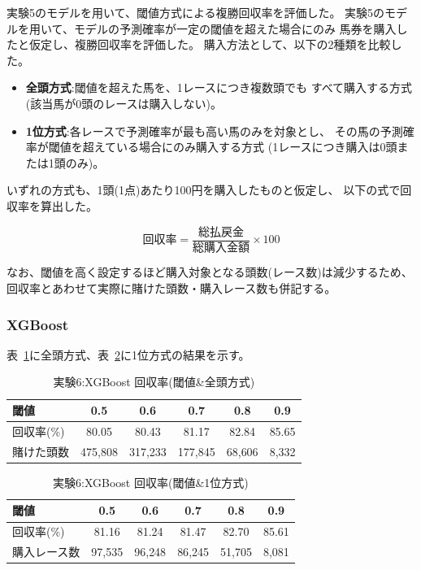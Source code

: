 \documentclass[dvipdfmx, a4paper, 11pt, titlepage]{jsarticle}
\begin{document}
実験5のモデルを用いて、閾値方式による複勝回収率を評価した。
実験5のモデルを用いて、モデルの予測確率が一定の閾値を超えた場合にのみ
馬券を購入したと仮定し、複勝回収率を評価した。
購入方法として、以下の2種類を比較した。

\begin{itemize}
  \item \textbf{全頭方式}:閾値を超えた馬を、1レースにつき複数頭でも
        すべて購入する方式(該当馬が0頭のレースは購入しない)。
  \item \textbf{1位方式}:各レースで予測確率が最も高い馬のみを対象とし、
        その馬の予測確率が閾値を超えている場合にのみ購入する方式
        (1レースにつき購入は0頭または1頭のみ)。
\end{itemize}

いずれの方式も、1頭(1点)あたり100円を購入したものと仮定し、
以下の式で回収率を算出した。

\[
  \text{回収率} = \frac{\text{総払戻金}}{\text{総購入金額}} \times 100
\]

なお、閾値を高く設定するほど購入対象となる頭数(レース数)は減少するため、
回収率とあわせて実際に賭けた頭数・購入レース数も併記する。


\subsubsection*{XGBoost}

表~\ref{tab:exp6_xgb_all}に全頭方式、表~\ref{tab:exp6_xgb_top1}に1位方式の結果を示す。

\begin{table}[H]
  \centering
  \caption{実験6:XGBoost 回収率(閾値\&全頭方式)}
  \label{tab:exp6_xgb_all}
  \begin{tabular}{lccccc}
    \toprule
    閾値 & 0.5 & 0.6 & 0.7 & 0.8 & 0.9 \\
    \midrule
    回収率(\%)   & 80.05 & 80.43 & 81.17 & 82.84 & 85.65 \\
    賭けた頭数   & 475{,}808 & 317{,}233 & 177{,}845 & 68{,}606 & 8{,}332 \\
    \bottomrule
  \end{tabular}
\end{table}

\begin{table}[H]
  \centering
  \caption{実験6:XGBoost 回収率(閾値\&1位方式)}
  \label{tab:exp6_xgb_top1}
  \begin{tabular}{lccccc}
    \toprule
    閾値 & 0.5 & 0.6 & 0.7 & 0.8 & 0.9 \\
    \midrule
    回収率(\%)     & 81.16 & 81.24 & 81.47 & 82.70 & 85.61 \\
    購入レース数   & 97{,}535 & 96{,}248 & 86{,}245 & 51{,}705 & 8{,}081 \\
    \bottomrule
  \end{tabular}
\end{table}
\end{document}
